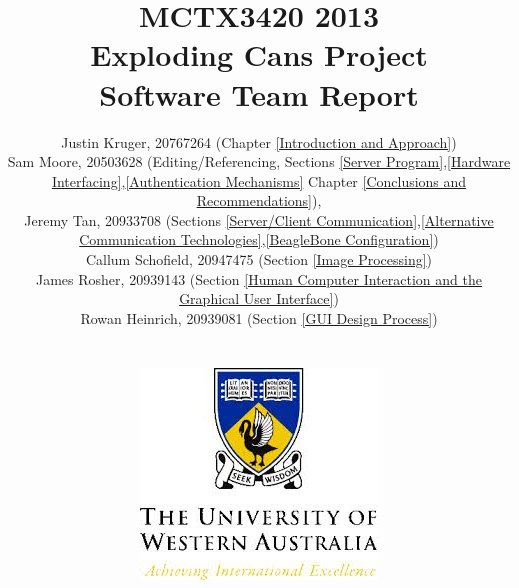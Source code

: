 \begin{titlepage}
\title{MCTX3420 2013\\Exploding Cans Project\\Software Team Report}
\author{Justin Kruger, 20767264 (Chapter \ref{Introduction and Approach})\\
		Sam Moore, 20503628 (Editing/Referencing, Sections \ref{Server Program},\ref{Hardware Interfacing},\ref{Authentication Mechanisms} Chapter \ref{Conclusions and Recommendations}), \\
		Jeremy Tan, 20933708 (Sections \ref{Server/Client Communication},\ref{Alternative Communication Technologies},\ref{BeagleBone Configuration})\\
		Callum Schofield, 20947475 (Section \ref{Image Processing})\\
		James Rosher, 20939143 (Section \ref{Human Computer Interaction and the Graphical User Interface}) \\
		Rowan Heinrich, 20939081 (Section \ref{GUI Design Process}) \\ \\ \\
		\includegraphics{figures/uwa_logo.jpeg}
}
\date{}
\maketitle
\centering
\end{titlepage}

